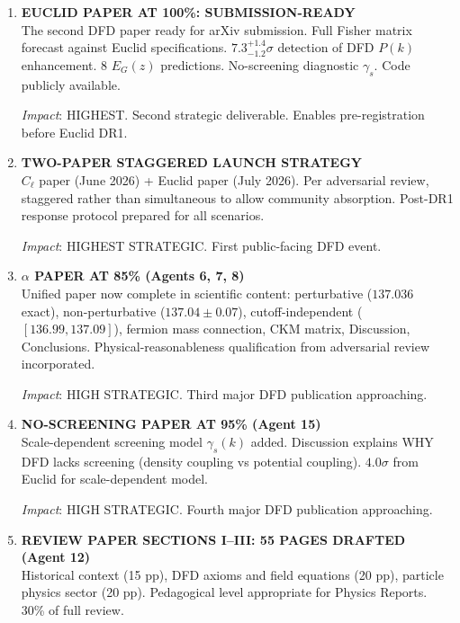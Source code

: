 \documentclass[11pt,a4paper]{article}
\begin{document}
\begin{enumerate}[label=\textbf{\arabic*.}, leftmargin=1.5cm]

\item \textbf{EUCLID PAPER AT 100\%: SUBMISSION-READY}\\
The second DFD paper ready for arXiv submission. Full Fisher matrix forecast against Euclid specifications. $7.3^{+1.4}_{-1.2}\sigma$ detection of DFD $P(k)$ enhancement. 8 $E_G(z)$ predictions. No-screening diagnostic $\gamma_s$. Code publicly available.

\textit{Impact}: HIGHEST. Second strategic deliverable. Enables pre-registration before Euclid DR1.

\item \textbf{TWO-PAPER STAGGERED LAUNCH STRATEGY}\\
$C_\ell$ paper (June 2026) + Euclid paper (July 2026). Per adversarial review, staggered rather than simultaneous to allow community absorption. Post-DR1 response protocol prepared for all scenarios.

\textit{Impact}: HIGHEST STRATEGIC. First public-facing DFD event.

\item \textbf{$\alpha$ PAPER AT 85\% (Agents 6, 7, 8)}\\
Unified paper now complete in scientific content: perturbative ($137.036$ exact), non-perturbative ($137.04 \pm 0.07$), cutoff-independent ($[136.99, 137.09]$), fermion mass connection, CKM matrix, Discussion, Conclusions. Physical-reasonableness qualification from adversarial review incorporated.

\textit{Impact}: HIGH STRATEGIC. Third major DFD publication approaching.

\item \textbf{NO-SCREENING PAPER AT 95\% (Agent 15)}\\
Scale-dependent screening model $\gamma_s(k)$ added. Discussion explains WHY DFD lacks screening (density coupling vs potential coupling). $4.0\sigma$ from Euclid for scale-dependent model.

\textit{Impact}: HIGH STRATEGIC. Fourth major DFD publication approaching.

\item \textbf{REVIEW PAPER SECTIONS I--III: 55 PAGES DRAFTED (Agent 12)}\\
Historical context (15 pp), DFD axioms and field equations (20 pp), particle physics sector (20 pp). Pedagogical level appropriate for Physics Reports. 30\% of full review.


\end{enumerate}
\end{document}
